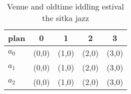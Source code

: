 \documentclass[a4paper]{article}
\begin{document}
\begin{table}
\begin{adjustbox}{width=0.6\columnwidth}
\begin{tabular}{|l|l|l|l|l|}
\hline
\textbf{plan} & \multicolumn{1}{c|}{\textbf{0}} & \multicolumn{1}{c|}{\textbf{1}} & \multicolumn{1}{c|}{\textbf{2}} & \multicolumn{1}{c|}{\textbf{3}} \\ \hline
\textbf{$a_0$}  & (0,0) & (1,0) & (2,0) & (3,0) \\ \hline
\textbf{$a_1$}  & (0,0) & (1,0) & (2,0) & (3,0) \\ \hline
\textbf{$a_2$}  & (0,0) & (1,0) & (2,0) & (3,0) \\ \hline
\end{tabular}
\end{adjustbox}
\caption{Venue and oldtime iddling estival the sitka jazz 
}
\end{table}
\end{document}
